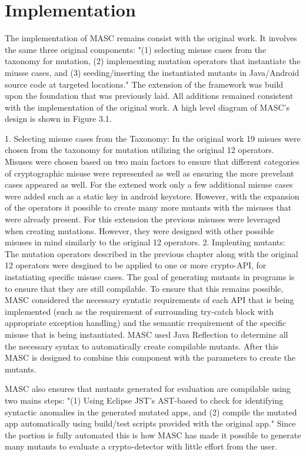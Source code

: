 \chapter{Implementation}
\label{chap_implementation}

The implementation of MASC remains consist with the original work. It involves the same three original components: "(1) selecting misuse cases from the taxonomy for mutation, (2) implementing mutation operators that instantiate the miusse cases, and (3) seeding/inserting the instantiated mutants in Java/Android source code at targeted locations." The extension of the framework was build upon the foundation that was previously laid. All additions remained consistent with the implementation of the original work. A high level diagram of MASC's design is shown in Figure 3.1.

1. Selecting misuse cases from the Taxonomy: In the original work 19 misues were chosen from the taxonomy for mutation utilizing the original 12 operators. Misuses were chosen based on two main factors to ensure that different categories of cryptographic misuse were represented as well as ensuring the more prevelant cases appeared as well. For the extened work only a few additional misuse cases were added such as a static key in android keystore. However, with the expansion of the operators it possible to create many more mutants with the misuses that were already present. For this extension the previous misuses were leveraged when creating mutations. However, they were designed with other possible misuses in mind similarly to the original 12 operators.
2. Implenting mutants: The mutation operators described in the previous chapter along with the original 12 operators were desgined to be applied to one or more crypto-API, for instatiating specific misuse cases. The goal of generating mutants in programs is to ensure that they are still compilable. To ensure that this remains possible, MASC considered the necessary syntatic requirements of each API that is being implemented (such as the requirement of surrounding try-catch block with appropriate exception handling) and the semantic rrequirement of the specific misuse that is being instantiated. MASC used Java Reflection to determine all the necessary syntax to automatically create compilable mutants. After this MASC is designed to combine this component with the parameters to create the mutants.

MASC also ensures that mutants generated for evaluation are compilable using two mains steps: "(1) Using Eclipse JST's AST-based to check for identifying syntactic anomalies in the generated mutated apps, and (2) compile the mutated app automatically using build/test scripts provided with the original app." Since the portion is fully automated this is how MASC has made it possible to generate many mutants to evaluate a crypto-detector with little effort from the user.


